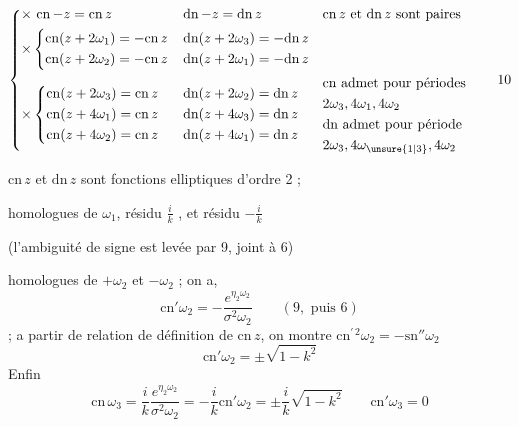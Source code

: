 \[
\left\{\begin{aligned}
&{\times}\ \mathrm{cn}\,{-z}=\mathrm{cn}\,z &&\mathrm{dn}\,{-z}=\mathrm{dn}\,z &&\mathrm{cn}\,z\text{ et }\mathrm{dn}\,z\text{ sont paires}\\
&{\times}\left\{\begin{aligned}
\mathrm{cn}(z+2\omega_1)&=-\mathrm{cn}\,z\\
\mathrm{cn}(z+2\omega_2)&=-\mathrm{cn}\,z
\end{aligned}\right. &&
\begin{aligned}\mathrm{dn}(z+2\omega_3)&=-\mathrm{dn}\,z\\
\mathrm{dn}(z+2\omega_1)&=-\mathrm{dn}\,z\end{aligned}\\
&{\times}\left\{\begin{aligned}
\mathrm{cn}(z+2\omega_3)&=\mathrm{cn}\,z\\
\mathrm{cn}(z+4\omega_1)&=\mathrm{cn}\,z\\
\mathrm{cn}(z+4\omega_2)&=\mathrm{cn}\,z
\end{aligned}\right. &&
\begin{aligned}\mathrm{dn}(z+2\omega_2)&=\mathrm{dn}\,z\\
\mathrm{dn}(z+4\omega_3)&=\mathrm{dn}\,z\\
\mathrm{dn}(z+4\omega_1)&=\mathrm{dn}\,z\end{aligned} &&
\begin{aligned}&\mathrm{cn}\text{ admet pour périodes}\\&2\omega_3,4\omega_1,4\omega_2\\
&\mathrm{dn}\text{ admet pour période}\\&2\omega_3,4\omega_{\unsure{1|3}},4\omega_2\end{aligned}
\end{aligned}\right. \tag*{10}
\]

$\mathrm{cn}\,z$ et $\mathrm{dn}\,z$ sont fonctions elliptiques d'ordre 2 ;

 homologues de $\omega_1$, résidu $\frac{i}{k}$ , et    résidu $-\frac{i}{k}$

(l'ambiguité de signe est levée par 9, joint à 6)

  homologues de $+\omega_2$ et $-\omega_2$ ; on a,
\[
\mathrm{cn}'\omega_2=-\frac{e^{\eta_2\omega_2}}{\sigma^2\omega_2}\qquad (9,\text{ puis }6)
\]
; a partir de relation de définition de $\mathrm{cn}\,z$, on montre $\mathrm{cn}^{\prime\,2}\omega_2=-\mathrm{sn}''\omega_2$
\[
\mathrm{cn}'\omega_2=\pm\sqrt{1-k^2}
\]
Enfin
\[
\mathrm{cn}\,\omega_3=\frac{i}{k}\frac{e^{\eta_2\omega_2}}{\sigma^2\omega_2}=-\frac{i}{k}\mathrm{cn}'\omega_2=\pm\frac{i}{k}\sqrt{1-k^2}\qquad \mathrm{cn}'\omega_3=0
\]

